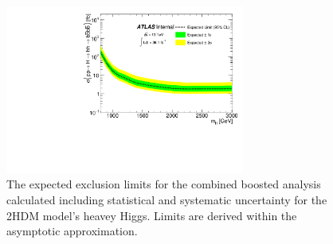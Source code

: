 \begin{figure}
\begin{center}
\includegraphics[angle=270, width=0.7\textwidth]{figures/boosted/Limit_Stat/BrazilPlot_Asymptotic_2HDM_merged.pdf}
\caption{The expected exclusion limits for the combined boosted analysis calculated including statistical and systematic uncertainty for the 2HDM model's heavey Higgs. Limits are derived within the asymptotic approximation.}
\label{fig:brazil_hh_boosted_all_2HDM_syst}
\end{center}
\end{figure}




